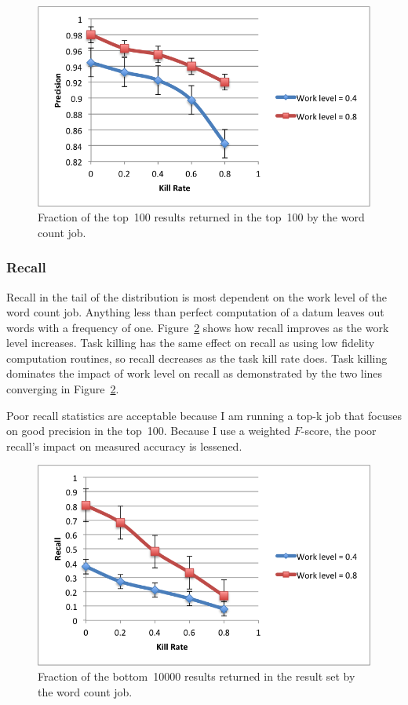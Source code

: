 \documentclass[12pt,twocolumn]{article}
\begin{document}
\begin{figure}
\includegraphics[width=\linewidth]{top-100-precision.png}
\caption{Fraction of the top~100 results returned in the top~100 by the word count job.}
\label{fig:precision}
\end{figure}

\subsubsection{Recall}
Recall in the tail of the distribution is most dependent on the work level of the word count job.
Anything less than perfect computation of a datum leaves out words with a frequency of one.
Figure~\ref{fig:recall} shows how recall improves as the work level increases. Task killing has
the same effect on recall as using low fidelity computation routines, so recall decreases as
the task kill rate does. Task killing dominates the impact of work level on recall as demonstrated
by the two lines converging in Figure~\ref{fig:recall}.

Poor recall statistics are acceptable because I am running a top-k job that focuses
on good precision in the top~100. Because I use a weighted $F$-score, the poor recall's impact
on measured accuracy is lessened.

\begin{figure}
\includegraphics[width=\linewidth]{recall.png}
\caption{Fraction of the bottom~10000 results returned in the result set by the word count job.}
\label{fig:recall}
\end{figure}
\end{document}
